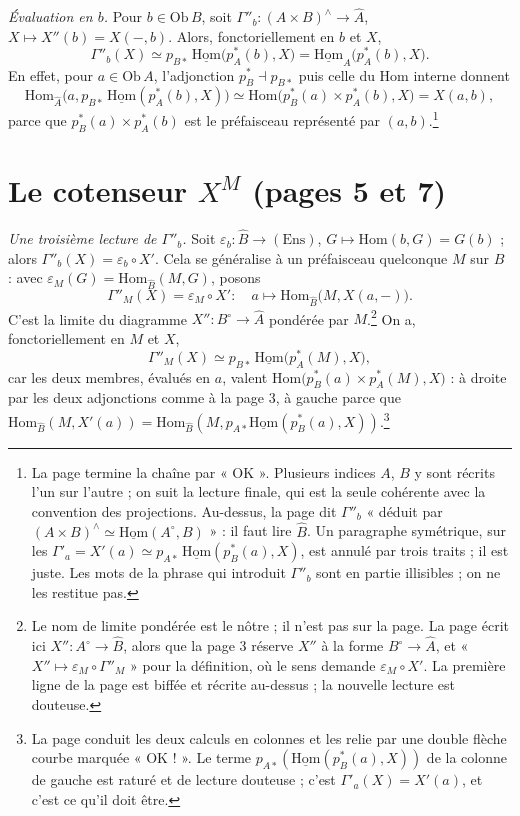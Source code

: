 \documentclass[11pt,a4paper]{article}
\begin{document}
\emph{Évaluation en $b$.} Pour $b \in \mathrm{Ob}\, B$, soit
$\Gamma''_{b} : (A \times B)^{\wedge} \to \widehat{A}$, $X \mapsto X''(b) =
X(-, b)$. Alors, fonctoriellement en $b$ et $X$,
\[
\Gamma''_{b}(X) \simeq p_{B*}\, \underline{\mathrm{Hom}}\bigl(p_{A}^{*}(b),
X\bigr) = \underline{\mathrm{Hom}}_{A}\bigl(p_{A}^{*}(b), X\bigr).
\]
En effet, pour $a \in \mathrm{Ob}\, A$, l'adjonction $p_{B}^{*} \dashv p_{B*}$
puis celle du Hom interne donnent
\[
\mathrm{Hom}_{\widehat{A}}\bigl(a, p_{B*}\, \underline{\mathrm{Hom}}(p_{A}^{*}(b),
X)\bigr) \simeq \mathrm{Hom}\bigl(p_{B}^{*}(a) \times p_{A}^{*}(b), X\bigr)
= X(a, b),
\]
parce que $p_{B}^{*}(a) \times p_{A}^{*}(b)$ est le préfaisceau représenté par
$(a, b)$.\footnote{La page termine la chaîne par « OK ». Plusieurs indices
$A$, $B$ y sont récrits l'un sur l'autre ; on suit la lecture finale, qui est
la seule cohérente avec la convention des projections. Au-dessus, la page dit
$\Gamma''_{b}$ « déduit par $(A \times B)^{\wedge} \simeq
\underline{\mathrm{Hom}}(A^{\circ}, B)$ » : il faut lire $\widehat{B}$. Un
paragraphe symétrique, sur les $\Gamma'_{a} = X'(a) \simeq p_{A*}\,
\underline{\mathrm{Hom}}(p_{B}^{*}(a), X)$, est annulé par trois traits ; il
est juste. Les mots de la phrase qui introduit $\Gamma''_{b}$ sont en partie
illisibles ; on ne les restitue pas.}

\section*{Le cotenseur $X^{M}$ (pages 5 et 7)}

\emph{Une troisième lecture de $\Gamma''_{b}$.} Soit $\varepsilon_{b} :
\widehat{B} \to (\mathrm{Ens})$, $G \mapsto \mathrm{Hom}(b, G) = G(b)$ ; alors
$\Gamma''_{b}(X) = \varepsilon_{b} \circ X'$. Cela se généralise à un
préfaisceau quelconque $M$ sur $B$ : avec $\varepsilon_{M}(G) =
\mathrm{Hom}_{\widehat{B}}(M, G)$, posons
\[
\Gamma''_{M}(X) = \varepsilon_{M} \circ X' : \quad a \longmapsto
\mathrm{Hom}_{\widehat{B}}\bigl(M, X(a, -)\bigr).
\]
C'est la limite du diagramme $X'' : B^{\circ} \to \widehat{A}$ pondérée par
$M$.\footnote{Le nom de limite pondérée est le nôtre ; il n'est pas sur la
page. La page écrit ici $X'' : A^{\circ} \to \widehat{B}$, alors que la page
3 réserve $X''$ à la forme $B^{\circ} \to \widehat{A}$, et
« $X'' \mapsto \varepsilon_{M} \circ \Gamma''_{M}$ » pour la définition, où le
sens demande $\varepsilon_{M} \circ X'$. La première ligne de la page est
biffée et récrite au-dessus ; la nouvelle lecture est douteuse.} On a,
fonctoriellement en $M$ et $X$,
\[
\Gamma''_{M}(X) \simeq p_{B*}\, \underline{\mathrm{Hom}}\bigl(p_{A}^{*}(M),
X\bigr),
\]
car les deux membres, évalués en $a$, valent
$\mathrm{Hom}\bigl(p_{B}^{*}(a) \times p_{A}^{*}(M), X\bigr)$ : à droite par
les deux adjonctions comme à la page 3, à gauche parce que
$\mathrm{Hom}_{\widehat{B}}(M, X'(a)) = \mathrm{Hom}_{\widehat{B}}(M,
p_{A*}\underline{\mathrm{Hom}}(p_{B}^{*}(a), X))$.\footnote{La page conduit les
deux calculs en colonnes et les relie par une double flèche courbe marquée
« OK ! ». Le terme $p_{A*}(\underline{\mathrm{Hom}}(p_{B}^{*}(a), X))$ de la
colonne de gauche est raturé et de lecture douteuse ; c'est $\Gamma'_{a}(X) =
X'(a)$, et c'est ce qu'il doit être.}
\end{document}
